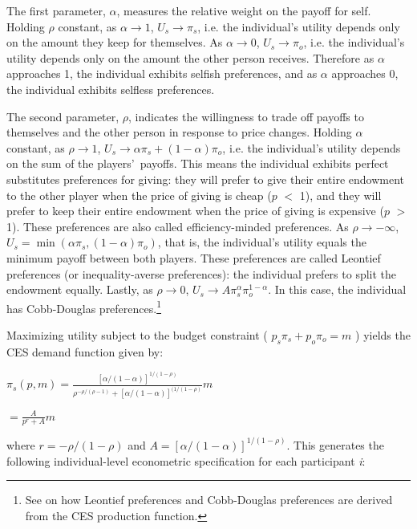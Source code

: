 \documentclass[12pt]{article}
\begin{document}
The first parameter, \(\alpha\), measures the relative weight on the payoff for self. Holding \(\rho\) constant, as \(\alpha \rightarrow 1\), \(U_{s} \rightarrow \pi_{s}\), i.e. the individual\rq s utility depends only on the amount they keep for themselves. As \(\alpha \rightarrow 0\), \(U_{s} \rightarrow \pi_{o}\), i.e. the individual\rq s utility depends only on the amount the other person receives. Therefore as \(\alpha\) approaches 1, the individual exhibits selfish preferences, and as \(\alpha\) approaches 0, the individual exhibits selfless preferences.

The second parameter, \(\rho\), indicates the willingness to trade off payoffs to themselves and the other person in response to price changes. Holding \(\alpha\) constant, as \(\rho \rightarrow 1\), \(U_{s} \rightarrow \alpha\pi_{s} + (1-\alpha)\pi_{o}\),  i.e. the individual\rq s utility depends on the sum of the players\rq \ payoffs. This means the individual exhibits perfect substitutes preferences for giving: they will prefer to give their entire endowment to the other player when the price of giving is cheap (\(p\) $<$ 1), and they will prefer to keep their entire endowment when the price of giving is expensive (\(p\) $>$ 1). These preferences are also called efficiency-minded preferences. As \(\rho \rightarrow -\infty\), \(U_{s} = \min(\alpha\pi_{s}, (1-\alpha)\pi_{o})\), that is, the individual\rq s utility equals the minimum payoff between both players. These preferences are called Leontief preferences (or inequality-averse preferences): the individual prefers to split the endowment equally. Lastly, as \(\rho \rightarrow 0\), \(U_{s} \rightarrow A\pi_{s}^{\alpha}\pi_{o}^{1-\alpha}\). In this case, the individual has Cobb-Douglas preferences.\footnote{See \cite{arrow_1961} on how Leontief preferences and Cobb-Douglas preferences are derived from the CES production function.}

Maximizing utility subject to the budget constraint ( \(p_{s}\pi_{s} + p_{o}\pi_{o}=m\) ) yields the CES demand function given by:
 
\vspace{3mm} \(\pi_{s}(p,m)=\frac{[\alpha/(1-\alpha)]^{1/(1-\rho)}}{\rho^{-\rho/(\rho-1)}+[\alpha/(1-\alpha)]^{(1/(1-\rho)}}m\)

\vspace{4mm} \hspace{14.5mm} \(= \frac{A}{p^{r}+A}m\)
 
\vspace{3mm} \noindent where \(r=-\rho / (1-\rho) \) and \(A=[\alpha / (1-\alpha)]^{1/(1-\rho)} \). This generates the following individual-level econometric specification for each participant \textit{i}: 
 
\end{document}

